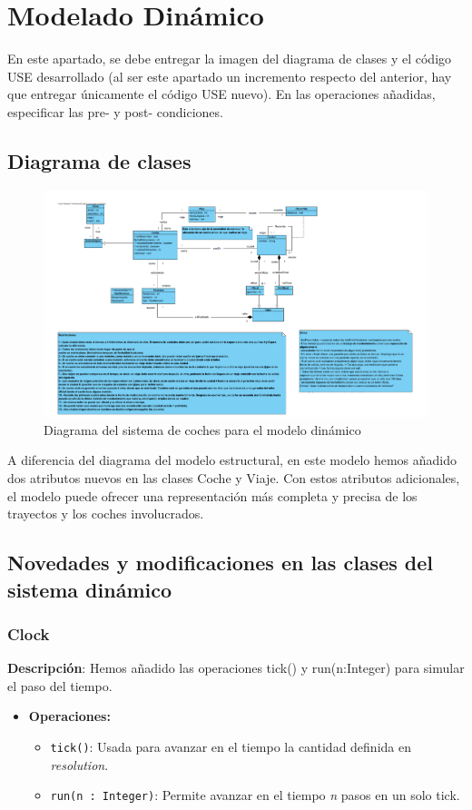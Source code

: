 \documentclass[12pt.a4paper]{article}
\begin{document}
\newpage
\section{Modelado Dinámico}
En este apartado, se debe entregar la imagen del diagrama de clases y el código USE desarrollado (al ser este apartado un incremento respecto del anterior, hay que entregar únicamente el código USE nuevo). En las operaciones añadidas, especificar las pre- y post- condiciones.

\subsection{Diagrama de clases}
\begin{figure}[H]
     \includegraphics[width=1\linewidth]{diagramas/DiagramaVPP_apartadoB.png}
     \caption{Diagrama del sistema de coches para el modelo dinámico}
     \label{Diagrama del sistema de coches}
\end{figure}

A diferencia del diagrama del modelo estructural, en este modelo hemos añadido dos atributos nuevos en las clases Coche y Viaje. Con estos atributos adicionales, el modelo puede ofrecer una representación más completa y precisa de los trayectos y los coches involucrados.

\subsection{Novedades y modificaciones en las clases del sistema dinámico}
\subsubsection{Clock}
\textbf{Descripción}:  Hemos añadido las operaciones tick() y run(n:Integer) para simular el paso del tiempo.
\begin{itemize}
    \item \textbf{Operaciones:}
    \begin{itemize}
        \item \texttt{tick()}: Usada para avanzar en el tiempo la cantidad definida en \emph{resolution}.
        \item \texttt{run(n : Integer)}: Permite avanzar en el tiempo \emph{n} pasos en un solo tick.
    \end{itemize}
\end{itemize}
    
\end{document}
